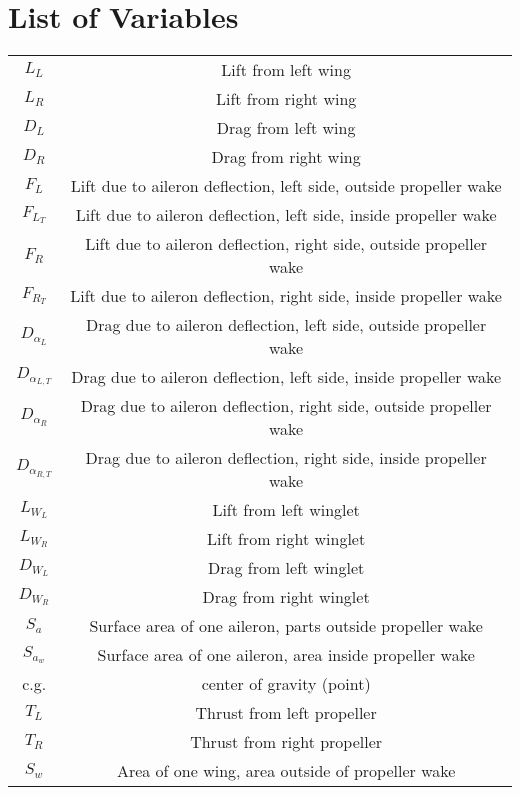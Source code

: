 \section*{List of Variables}
\begin{center}\begin{tabular}{| c | c |} 
    $L_L$       & Lift from left wing \\
    $L_R$       & Lift from right wing \\
    $D_L$       & Drag from left wing \\
    $D_R$       & Drag from right wing \\
    $F_L$       & Lift due to aileron deflection, left side, outside propeller wake \\
    $F_{L_T}$   & Lift due to aileron deflection, left side, inside propeller wake \\
    $F_R$       & Lift due to aileron deflection, right side, outside propeller wake \\
    $F_{R_T}$   & Lift due to aileron deflection, right side, inside propeller wake \\
    $D_{\alpha_L}$ & Drag due to aileron deflection, left side, outside propeller wake \\
    $D_{\alpha_{L,T}}$ & Drag due to aileron deflection, left side, inside propeller wake \\
    $D_{\alpha_{R}}$ & Drag due to aileron deflection, right side, outside propeller wake \\
    $D_{\alpha_{R,T}}$ & Drag due to aileron deflection, right side, inside propeller wake \\
    $L_{W_L}$ & Lift from left winglet \\
    $L_{W_R}$ & Lift from right winglet \\
    $D_{W_L}$ & Drag from left winglet \\
    $D_{W_R}$ & Drag from right winglet \\
    $S_a$  & Surface area of one aileron, parts outside propeller wake \\
    $S_{a_w}$ & Surface area of one aileron, area inside propeller wake \\
    c.g.    & center of gravity (point) \\
    $T_L$   & Thrust from left propeller \\ 
    $T_R$   & Thrust from right propeller \\
    $S_w$   & Area of one wing, area outside of propeller wake \\

\end{tabular}
\end{center}
